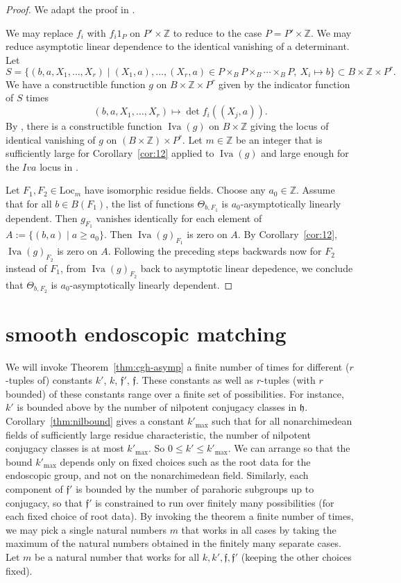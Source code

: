 \documentclass[12pt]{amsart}
\newcommand{\op}[1]{\operatorname{#1}}
\newcommand{\ring}[1]{{\mathbb #1}}
\newcommand{\locus}[1]{\op{Iva}(#1)}
\def\s{{\mathfrak{f}}}
\newcommand{\fh}{\mathfrak{h}}
\newcommand{\Loc}{\mathrm{Loc}}
\theoremstyle{plain}
\theoremstyle{definition}
\begin{document}
\begin{proof} We adapt the proof in \cite{CGH2}.

We may replace $f_i$ with $f_i 1_P$ on $P'\times\ring{Z}$ to reduce
to the case $P=P'\times\ring{Z}$.  We may reduce asymptotic linear
dependence to the identical vanishing of a determinant.
Let 
\[
S = \{(b,a,X_1,\ldots,X_r)\mid (X_1,a),\ldots,(X_r,a)\in P\times_B
P\times_B\cdots\times_B P,~X_i\mapsto b\} \subset B\times\ring{Z}\times P^r.
\]
We have a constructible function $g$ on $B\times\ring{Z}\times P^r$
given by the indicator function of $S$ times
\[
(b,a,X_1,\ldots,X_r)\mapsto 
\det f_i((X_j,a)).
\]
By \cite{CGH1}, there is a constructible function $\locus{g}$ on
$B\times\ring{Z}$ giving the locus of identical vanishing of $g$ on
$(B\times\ring{Z})\times P^r$.
Let $m\in\ring{Z}$ be an integer that is sufficiently large for
Corollary~\ref{cor:12} applied to $\locus{g}$ and large enough for the
$Iva$ locus in \cite{CGH1}.

Let $F_1,F_2\in\Loc_m$ have isomorphic residue fields.  Choose any
$a_0\in\ring{Z}$.  Assume that for all $b\in B(F_1)$, the list of
functions $\Theta_{b,F_1}$ is $a_0$-asymptotically linearly dependent.
Then $g_{F_1}$ vanishes identically for each element of $A:=\{(b,a)\mid
a\ge a_0\}$.  Then $\locus{g}_{F_1}$ is zero on $A$.  By
Corollary~\ref{cor:12}, $\locus{g}_{F_2}$ is zero on $A$.  Following
the preceding steps backwards now for $F_2$ instead of $F_1$, from
$\locus{g}_{F_2}$ back to asymptotic linear depedence, we conclude that
$\Theta_{b,F_2}$ is $a_0$-asymptotically linearly dependent.
\end{proof}



\section{smooth endoscopic matching}


We will invoke Theorem~\ref{thm:cgh-asymp} a finite number of times for different
($r$-tuples of) constants $k'$, $k$, $\s'$, $\s$.  These constants as
well as $r$-tuples (with $r$ bounded) of these constants range over a
finite set of possibilities.  For instance, $k'$ is bounded above by
the number of nilpotent conjugacy classes in $\fh$.  Corollary~\ref{thm:nilbound}
gives a
constant $k'_{\op{max}}$ such that for all nonarchimedean fields of
sufficiently large residue characteristic, the number of nilpotent
conjugacy classes is at most $k'_{\op{max}}$.  So $0\le k'\le
k'_{\op{max}}$.  We can arrange so that the bound $k'_{\op{max}}$
depends only on fixed choices such as the root data for the endoscopic
group, and not on the nonarchimedean field.  Similarly, each component
of $\s'$ is bounded by the number of parahoric subgroups up to
conjugacy, so that $\s'$ is constrained to run over finitely many
possibilities (for each fixed choice of root data). By invoking the
theorem a finite number of times, we may pick a single natural numbers
$m$ that works in all cases by taking the maximum of the natural
numbers obtained in the finitely many separate cases.  Let $m$ be a
natural number that works for all $k,k',\s,\s'$ (keeping the other
choices fixed).
\end{document}
